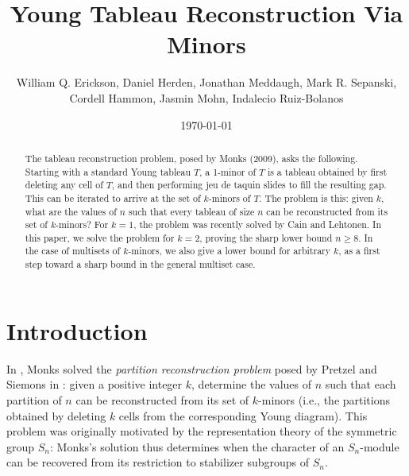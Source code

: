 \documentclass[12pt]{amsart}
\title[Young Tableaux Via Minors]{Young Tableau Reconstruction Via Minors}
\author[Erickson, Herden, Meddaugh, Sepanski, $\ldots$]{William Q. Erickson, Daniel Herden, Jonathan Meddaugh, Mark R. Sepanski, Cordell Hammon, Jasmin Mohn, Indalecio Ruiz-Bolanos}
\date{\today}
\theoremstyle{definition}
\theoremstyle{remark}
\numberwithin{equation}{section}
\numberwithin{figure}{section}
\begin{document}


\begin{abstract}
    The tableau reconstruction problem, posed by Monks (2009), asks the following.  Starting with a standard Young tableau $T$, a 1-minor of $T$ is a tableau obtained by first deleting any cell of $T$, and then performing jeu de taquin slides to fill the resulting gap. This can be iterated to arrive at the set of $k$-minors of $T$.  The problem is this: given $k$, what are the values of $n$ such that every tableau of size $n$ can be reconstructed from its set of $k$-minors?  For $k=1$, the problem was recently solved by Cain and Lehtonen.  In this paper, we solve the problem for $k=2$, proving the sharp lower bound $n \geq 8$.  In the case of multisets of $k$-minors, we also give a lower bound for arbitrary $k$, as a first step toward a sharp bound in the general multiset case.  \end{abstract}


\maketitle
\tableofcontents
{}



\section{Introduction}

In \cite{Monks2009}, Monks solved the \emph{partition reconstruction problem} posed by Pretzel and Siemons in \cite{Pretzel}: given a positive integer $k$, determine the values of $n$ such that each partition of $n$ can be reconstructed from its set of $k$-minors (i.e., the partitions obtained by deleting $k$ cells from the corresponding Young diagram).  This problem was originally motivated by the representation theory of the symmetric group $S_n$: Monks's solution thus determines when the character of an $S_n$-module can be recovered from its restriction to stabilizer subgroups of $S_n$.
\end{document}
